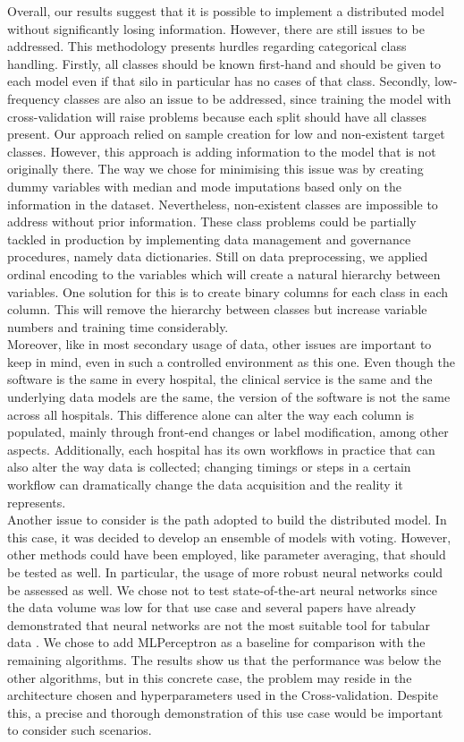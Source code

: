 Overall, our results suggest that it is possible to implement a distributed model without significantly losing information. However, there are still issues to be addressed. This methodology presents hurdles regarding categorical class handling. Firstly, all classes should be known first-hand and should be given to each model even if that silo in particular has no cases of that class. Secondly, low-frequency classes are also an issue to be addressed, since training the model with cross-validation will raise problems because each split should have all classes present. Our approach relied on sample creation for low and non-existent target classes. However, this approach is adding information to the model that is not originally there. The way we chose for minimising this issue was by creating dummy variables with median and mode imputations based only on the information in the dataset. Nevertheless, non-existent classes are impossible to address without prior information. These class problems could be partially tackled in production by implementing data management and governance procedures, namely data dictionaries. Still on data preprocessing, we applied ordinal encoding to the variables which will create a natural hierarchy between variables. One solution for this is to create binary columns for each class in each column. This will remove the hierarchy between classes but increase variable numbers and training time considerably.\\
Moreover, like in most secondary usage of data, other issues are important to keep in mind, even in such a controlled environment as this one. Even though the software is the same in every hospital, the clinical service is the same and the underlying data models are the same, the version of the software is not the same across all hospitals. This difference alone can alter the way each column is populated, mainly through front-end changes or label modification, among other aspects. Additionally, each hospital has its own workflows in practice that can also alter the way data is collected; changing timings or steps in a certain workflow can dramatically change the data acquisition and the reality it represents. \\
Another issue to consider is the path adopted to build the distributed model. In this case, it was decided to develop an ensemble of models with voting. However, other methods could have been employed, like parameter averaging, that should be tested as well. In particular, the usage of more robust neural networks could be assessed as well. We chose not to test state-of-the-art neural networks since the data volume was low for that use case and several papers have already demonstrated that neural networks are not the most suitable tool for tabular data \cite{grinsztajnWhyTreebasedModels2022,borisovDeepNeuralNetworks2022}. We chose to add MLPerceptron as a baseline for comparison with the remaining algorithms. The results show us that the performance was below the other algorithms, but in this concrete case, the problem may reside in the architecture chosen and hyperparameters used in the Cross-validation. Despite this, a precise and thorough demonstration of this use case would be important to consider such scenarios. \\
